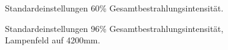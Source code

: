 \documentclass[a4paper,bibtotoc,oneside]{scrbook}
\begin{document}
\begin{figure} [htbp]
\caption{Standardeinstellungen 60\% Gesamtbestrahlungsintensität.}
\label{st60}
\end{figure} 

\begin{figure} [htbp]
\caption{Standardeinstellungen 96\% Gesamtbestrahlungsintensität, Lampenfeld auf 4200mm.}
\label{h96}
\end{figure} 
\end{document}
